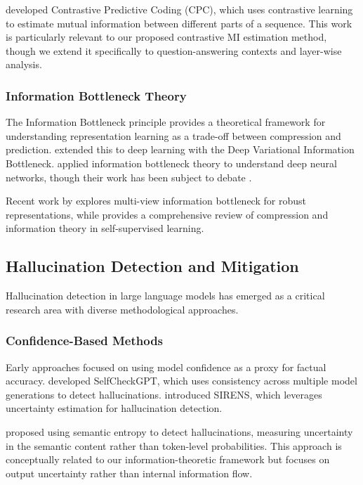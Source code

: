 \citet{oord2018representation} developed Contrastive Predictive Coding (CPC), which uses contrastive learning to estimate mutual information between different parts of a sequence. This work is particularly relevant to our proposed contrastive MI estimation method, though we extend it specifically to question-answering contexts and layer-wise analysis.

\subsubsection{Information Bottleneck Theory}
The Information Bottleneck principle \citep{tishby2000information} provides a theoretical framework for understanding representation learning as a trade-off between compression and prediction. \citet{alemi2017deep} extended this to deep learning with the Deep Variational Information Bottleneck. \citet{shwartz2017opening} applied information bottleneck theory to understand deep neural networks, though their work has been subject to debate \citep{saxe2019information}.

Recent work by \citet{federici2020learning} explores multi-view information bottleneck for robust representations, while \citet{shwartz2023compress} provides a comprehensive review of compression and information theory in self-supervised learning.

\subsection{Hallucination Detection and Mitigation}
\label{subsec:hallucination_detection}

Hallucination detection in large language models has emerged as a critical research area with diverse methodological approaches.

\subsubsection{Confidence-Based Methods}
Early approaches focused on using model confidence as a proxy for factual accuracy. \citet{manakul2023selfcheckgpt} developed SelfCheckGPT, which uses consistency across multiple model generations to detect hallucinations. \citet{zhang2023sirens} introduced SIRENS, which leverages uncertainty estimation for hallucination detection.

\citet{farquhar2024detecting} proposed using semantic entropy to detect hallucinations, measuring uncertainty in the semantic content rather than token-level probabilities. This approach is conceptually related to our information-theoretic framework but focuses on output uncertainty rather than internal information flow.

